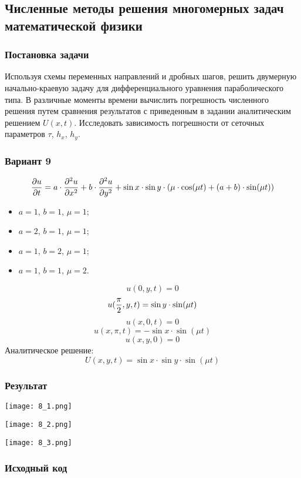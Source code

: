 \graphicspath{{images/}}

\subsection{Численные методы решения многомерных задач математической физики}

\subsubsection{Постановка задачи}
Используя схемы переменных направлений и дробных шагов, решить двумерную начально-краевую задачу для дифференциального уравнения параболического типа. В различные моменты времени вычислить погрешность численного решения путем сравнения результатов с приведенным в задании аналитическим решением $U(x, t)$. Исследовать зависимость погрешности от сеточных параметров $\tau$, $h_x$, $h_y$.

\subsubsection{Вариант 9}
$$ {{\partial u} \over {\partial t}} = a \cdot {{\partial^2 u} \over {\partial x^2}} + b \cdot {{\partial^2 u} \over {\partial y^2}} + \sin{x} \cdot \sin{y} \cdot (\mu \cdot \cos(\mu t) + (a + b) \cdot \sin(\mu t)) $$
\begin{itemize}
    \item $a = 1$, $b = 1$, $\mu = 1$;
    \item $a = 2$, $b = 1$, $\mu = 1$;
    \item $a = 1$, $b = 2$, $\mu = 1$;
    \item $a = 1$, $b = 1$, $\mu = 2$.
\end{itemize}
$$ u(0, y, t) = 0 $$
$$ u({{\pi} \over {2}}, y, t) = \sin{y} \cdot \sin(\mu t) $$
$$ u(x, 0, t) = 0 $$
$$ u(x, \pi, t) = -\sin{x} \cdot \sin(\mu t) $$
$$ u(x, y, 0) = 0$$
Аналитическое решение:
$$ U(x, y, t) = \sin{x} \cdot \sin{y} \cdot \sin(\mu t) $$
\pagebreak

\subsubsection{Результат}
\begin{center}
    \texttt{[image: 8\_1.png]}\newline\noindent
\end{center}
\pagebreak

\begin{center}
    \texttt{[image: 8\_2.png]}\newline\noindent
\end{center}
\pagebreak

\begin{center}
    \texttt{[image: 8\_3.png]}\newline\noindent
\end{center}
\pagebreak

\subsubsection{Исходный код}

\pagebreak
